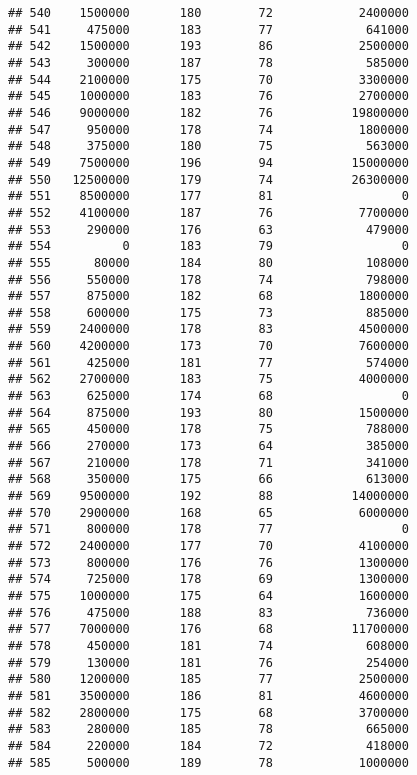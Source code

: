 \documentclass[
]{article}
\begin{document}
\begin{verbatim}
## 540    1500000       180        72            2400000
## 541     475000       183        77             641000
## 542    1500000       193        86            2500000
## 543     300000       187        78             585000
## 544    2100000       175        70            3300000
## 545    1000000       183        76            2700000
## 546    9000000       182        76           19800000
## 547     950000       178        74            1800000
## 548     375000       180        75             563000
## 549    7500000       196        94           15000000
## 550   12500000       179        74           26300000
## 551    8500000       177        81                  0
## 552    4100000       187        76            7700000
## 553     290000       176        63             479000
## 554          0       183        79                  0
## 555      80000       184        80             108000
## 556     550000       178        74             798000
## 557     875000       182        68            1800000
## 558     600000       175        73             885000
## 559    2400000       178        83            4500000
## 560    4200000       173        70            7600000
## 561     425000       181        77             574000
## 562    2700000       183        75            4000000
## 563     625000       174        68                  0
## 564     875000       193        80            1500000
## 565     450000       178        75             788000
## 566     270000       173        64             385000
## 567     210000       178        71             341000
## 568     350000       175        66             613000
## 569    9500000       192        88           14000000
## 570    2900000       168        65            6000000
## 571     800000       178        77                  0
## 572    2400000       177        70            4100000
## 573     800000       176        76            1300000
## 574     725000       178        69            1300000
## 575    1000000       175        64            1600000
## 576     475000       188        83             736000
## 577    7000000       176        68           11700000
## 578     450000       181        74             608000
## 579     130000       181        76             254000
## 580    1200000       185        77            2500000
## 581    3500000       186        81            4600000
## 582    2800000       175        68            3700000
## 583     280000       185        78             665000
## 584     220000       184        72             418000
## 585     500000       189        78            1000000

\end{verbatim}
\end{document}
